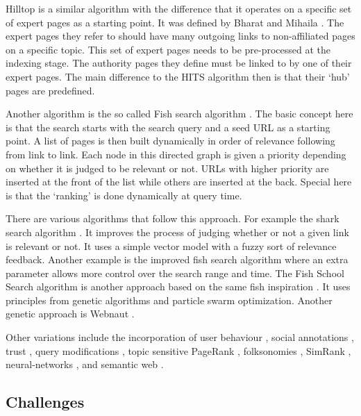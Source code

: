 Hilltop is a similar algorithm with the difference that it operates on a specific set of expert pages as a starting point. It was defined by Bharat and Mihaila \autocite*{Bharat2000}. The expert pages they refer to should have many outgoing links to non-affiliated pages on a specific topic. This set of expert pages needs to be pre-processed at the indexing stage. The authority pages they define must be linked to by one of their expert pages. The main difference to the HITS algorithm then is that their `hub' pages are predefined.

Another algorithm is the so called Fish search algorithm \autocite{DeBra1994, DeBra1994a, DeBra1994b}. The basic concept here is that the search starts with the search query and a seed \ac{URL} as a starting point. A list of pages is then built dynamically in order of relevance following from link to link. Each node in this directed graph is given a priority depending on whether it is judged to be relevant or not. \ac{URL}s with higher priority are inserted at the front of the list while others are inserted at the back. Special here is that the `ranking' is done dynamically at query time.

There are various algorithms that follow this approach. For example the shark search algorithm \autocite{Hersovici1998}. It improves the process of judging whether or not a given link is relevant or not. It uses a simple vector model with a fuzzy sort of relevance feedback. Another example is the improved fish search algorithm \autocite{Luo2005} where an extra parameter allows more control over the search range and time. The Fish School Search algorithm is another approach based on the same fish inspiration \autocite{BastosFilho2008}. It uses principles from genetic algorithms and particle swarm optimization. Another genetic approach is Webnaut \autocite{Nick2001}.

Other variations include the incorporation of user behaviour \autocite{Agichtein2006}, social annotations \autocite{Bao2007}, trust \autocite{Garcia-Molina2004}, query modifications \autocite{Glover2001}, topic sensitive PageRank \autocite{Haveliwala2003}, folksonomies \autocite{Hotho2006}, SimRank \autocite{Jeh2002}, neural-networks \autocite{Shu1999}, and semantic web \autocite{Widyantoro2001,Du2007,Ding2004,Kamps2010,Taye2009}.


\subsection{Challenges}

